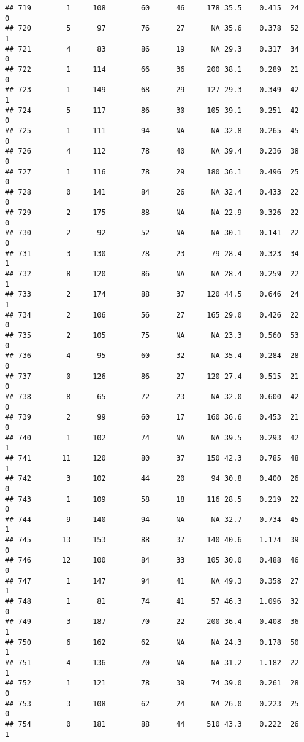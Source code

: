 \documentclass[
]{article}
\begin{document}
\begin{verbatim}
## 719        1     108        60      46     178 35.5    0.415  24    0
## 720        5      97        76      27      NA 35.6    0.378  52    1
## 721        4      83        86      19      NA 29.3    0.317  34    0
## 722        1     114        66      36     200 38.1    0.289  21    0
## 723        1     149        68      29     127 29.3    0.349  42    1
## 724        5     117        86      30     105 39.1    0.251  42    0
## 725        1     111        94      NA      NA 32.8    0.265  45    0
## 726        4     112        78      40      NA 39.4    0.236  38    0
## 727        1     116        78      29     180 36.1    0.496  25    0
## 728        0     141        84      26      NA 32.4    0.433  22    0
## 729        2     175        88      NA      NA 22.9    0.326  22    0
## 730        2      92        52      NA      NA 30.1    0.141  22    0
## 731        3     130        78      23      79 28.4    0.323  34    1
## 732        8     120        86      NA      NA 28.4    0.259  22    1
## 733        2     174        88      37     120 44.5    0.646  24    1
## 734        2     106        56      27     165 29.0    0.426  22    0
## 735        2     105        75      NA      NA 23.3    0.560  53    0
## 736        4      95        60      32      NA 35.4    0.284  28    0
## 737        0     126        86      27     120 27.4    0.515  21    0
## 738        8      65        72      23      NA 32.0    0.600  42    0
## 739        2      99        60      17     160 36.6    0.453  21    0
## 740        1     102        74      NA      NA 39.5    0.293  42    1
## 741       11     120        80      37     150 42.3    0.785  48    1
## 742        3     102        44      20      94 30.8    0.400  26    0
## 743        1     109        58      18     116 28.5    0.219  22    0
## 744        9     140        94      NA      NA 32.7    0.734  45    1
## 745       13     153        88      37     140 40.6    1.174  39    0
## 746       12     100        84      33     105 30.0    0.488  46    0
## 747        1     147        94      41      NA 49.3    0.358  27    1
## 748        1      81        74      41      57 46.3    1.096  32    0
## 749        3     187        70      22     200 36.4    0.408  36    1
## 750        6     162        62      NA      NA 24.3    0.178  50    1
## 751        4     136        70      NA      NA 31.2    1.182  22    1
## 752        1     121        78      39      74 39.0    0.261  28    0
## 753        3     108        62      24      NA 26.0    0.223  25    0
## 754        0     181        88      44     510 43.3    0.222  26    1

\end{verbatim}
\end{document}
